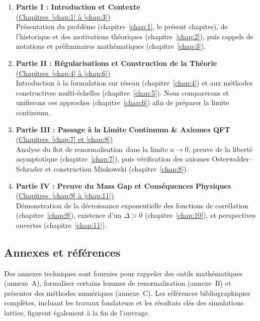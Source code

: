 \begin{enumerate}
	\item \textbf{Partie I : Introduction et Contexte} \\
	\underline{(Chapitres~\ref{chap:1} à \ref{chap:3})} \\
	Présentation du problème (chapitre~\ref{chap:1}, le présent chapitre), de l’historique et des motivations théoriques (chapitre~\ref{chap:2}), puis rappels de notations et préliminaires mathématiques (chapitre~\ref{chap:3}).
	
	\item \textbf{Partie II : Régularisations et Construction de la Théorie} \\
	\underline{(Chapitres~\ref{chap:4} à \ref{chap:6})} \\
	Introduction à la formulation sur réseau (chapitre~\ref{chap:4}) et aux méthodes constructives multi-échelles (chapitre~\ref{chap:5}). Nous comparerons et unifierons ces approches (chapitre~\ref{chap:6}) afin de préparer la limite continuum.
	
	\item \textbf{Partie III : Passage à la Limite Continuum \& Axiomes QFT} \\
	\underline{(Chapitres~\ref{chap:7} et \ref{chap:8})} \\
	Analyse du \og flot de renormalisation\fg\ dans la limite \(a \to 0\), preuve de la liberté asymptotique (chapitre~\ref{chap:7}), puis vérification des axiomes Osterwalder--Schrader et construction Minkowski (chapitre~\ref{chap:8}).
	
	\item \textbf{Partie IV : Preuve du Mass Gap et Conséquences Physiques} \\
	\underline{(Chapitres~\ref{chap:9} à \ref{chap:11})} \\
	Démonstration de la décroissance exponentielle des fonctions de corrélation (chapitre~\ref{chap:9}), existence d’un \(\Delta > 0\) (chapitre~\ref{chap:10}), et perspectives ouvertes (chapitre~\ref{chap:11}).
\end{enumerate}

\subsection*{Annexes et références}

Des annexes techniques sont fournies pour rappeler des outils mathématiques (annexe~A), formaliser certains lemmes de renormalisation (annexe~B) et présenter des méthodes numériques (annexe~C). Les références bibliographiques complètes, incluant les travaux fondateurs et les résultats clés des simulations lattice, figurent également à la fin de l’ouvrage.

